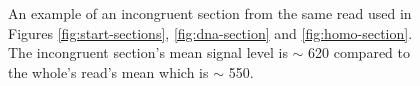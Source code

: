 \begin{figure}
\centering

	\caption{\label{fig:mess-section}An example of an incongruent section from the same read used in Figures \ref{fig:start-sections}, \ref{fig:dna-section} and \ref{fig:homo-section}. The incongruent section's mean signal level is $\sim$ 620 compared to the whole's read's mean which is $\sim$ 550.}
\end{figure}
